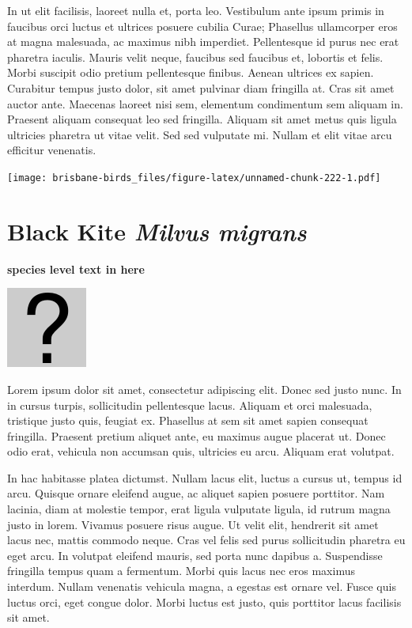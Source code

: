 \documentclass[]{book}
\let\origfigure\figure
\let\endorigfigure\endfigure
\renewenvironment{figure}[1][2] {
  \expandafter\origfigure\expandafter[H]
} {
  \endorigfigure
}
\begin{document}
In ut elit facilisis, laoreet nulla et, porta leo. Vestibulum ante ipsum
primis in faucibus orci luctus et ultrices posuere cubilia Curae;
Phasellus ullamcorper eros at magna malesuada, ac maximus nibh
imperdiet. Pellentesque id purus nec erat pharetra iaculis. Mauris velit
neque, faucibus sed faucibus et, lobortis et felis. Morbi suscipit odio
pretium pellentesque finibus. Aenean ultrices ex sapien. Curabitur
tempus justo dolor, sit amet pulvinar diam fringilla at. Cras sit amet
auctor ante. Maecenas laoreet nisi sem, elementum condimentum sem
aliquam in. Praesent aliquam consequat leo sed fringilla. Aliquam sit
amet metus quis ligula ultricies pharetra ut vitae velit. Sed sed
vulputate mi. Nullam et elit vitae arcu efficitur venenatis.

\begin{figure}
\centering
\texttt{[image: brisbane-birds\_files/figure-latex/unnamed-chunk-222-1.pdf]}
\caption{\label{fig:unnamed-chunk-222}insert figure caption}
\end{figure}

\section{\texorpdfstring{Black Kite \emph{Milvus
migrans}}{Black Kite Milvus migrans}}\label{black-kite-milvus-migrans}

\textbf{species level text in here}

\begin{figure}
\centering
\includegraphics{assets/missing.png}
\caption{No image for species}
\end{figure}

Lorem ipsum dolor sit amet, consectetur adipiscing elit. Donec sed justo
nunc. In in cursus turpis, sollicitudin pellentesque lacus. Aliquam et
orci malesuada, tristique justo quis, feugiat ex. Phasellus at sem sit
amet sapien consequat fringilla. Praesent pretium aliquet ante, eu
maximus augue placerat ut. Donec odio erat, vehicula non accumsan quis,
ultricies eu arcu. Aliquam erat volutpat.

In hac habitasse platea dictumst. Nullam lacus elit, luctus a cursus ut,
tempus id arcu. Quisque ornare eleifend augue, ac aliquet sapien posuere
porttitor. Nam lacinia, diam at molestie tempor, erat ligula vulputate
ligula, id rutrum magna justo in lorem. Vivamus posuere risus augue. Ut
velit elit, hendrerit sit amet lacus nec, mattis commodo neque. Cras vel
felis sed purus sollicitudin pharetra eu eget arcu. In volutpat eleifend
mauris, sed porta nunc dapibus a. Suspendisse fringilla tempus quam a
fermentum. Morbi quis lacus nec eros maximus interdum. Nullam venenatis
vehicula magna, a egestas est ornare vel. Fusce quis luctus orci, eget
congue dolor. Morbi luctus est justo, quis porttitor lacus facilisis sit
amet.
\end{document}
